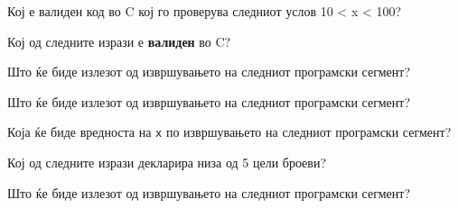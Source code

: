 \documentclass[11pt]{examdesign}
\begin{document}


\begin{multiplechoice}[title={},suppressprefix=yes,rearrange=no]
\begin{question}
Кој е валиден код во C кој го проверува следниот услов 10 < x < 100?
\end{question}

\begin{question}
Кој од следните изрази е \textbf{валиден} во C?
\end{question}

\begin{question}
Што ќе биде излезот од извршувањето на следниот програмски сегмент?
\end{question}

\begin{question}
Што ќе биде излезот од извршувањето на следниот програмски сегмент?
\end{question}

\begin{question}
Која ќе биде вредноста на \texttt{x} по извршувањето на следниот програмски сегмент?
\end{question}
  
\begin{question}
Кој од следните изрази декларира низа од 5 цели броеви?
\end{question}
  
\begin{question}
Што ќе биде излезот од извршувањето на следниот програмски сегмент?
\end{question}
  

\end{multiplechoice}
\end{document}
